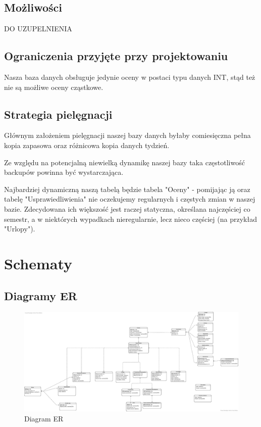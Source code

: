 \documentclass[60pt]{article}
\begin{document}
\subsection{Możliwości}

DO UZUPELNIENIA

\subsection{Ograniczenia przyjęte przy projektowaniu}

Nasza baza danych obsługuje jedynie oceny w postaci typu danych INT, stąd też nie są możliwe oceny cząstkowe. 

\subsection{Strategia pielęgnacji}

Głównym założeniem pielęgnacji naszej bazy danych byłaby comiesięczna pełna kopia zapasowa oraz różnicowa kopia danych tydzień. 

Ze względu na potencjalną niewielką dynamikę naszej bazy taka częstotliwość backupów powinna być wystarczająca. 

Najbardziej dynamiczną naszą tabelą będzie tabela "Oceny" - pomijając ją oraz tabelę "Usprawiedliwienia" nie oczekujemy regularnych i częstych zmian w naszej bazie. Zdecydowana ich większość jest raczej statyczna, określana najczęściej co semestr, a w niektórych wypadkach nieregularnie, lecz nieco częściej (na przykład "Urlopy").

\newpage
\section{Schematy}

\subsection{Diagramy ER}

\begin{figure}[h]
  \includegraphics[width=\linewidth]{diagram_ER.png}
  \caption{Diagram ER}
  \label{Diagram ER}
\end{figure}
\end{document}
